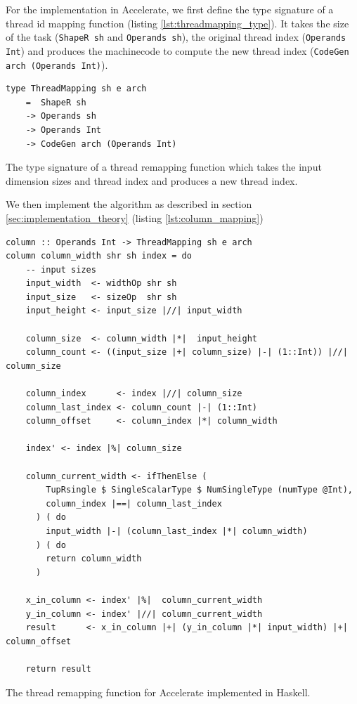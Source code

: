 For the implementation in Accelerate, we first define the type signature of a thread id mapping function (listing {\ref{lst:threadmapping_type}}).
It takes the size of the task (\texttt{ShapeR sh} and \texttt{Operands sh}), the  original thread index (\texttt{Operands Int}) and produces the machinecode to compute the new thread index (\texttt{CodeGen arch (Operands Int)}).
\begin{listing}[!ht]
    \begin{verbatim}    
type ThreadMapping sh e arch 
    =  ShapeR sh 
    -> Operands sh 
    -> Operands Int 
    -> CodeGen arch (Operands Int)
    \end{verbatim}
    \caption{
        The type signature of a thread remapping function which takes the input dimension sizes and thread index and produces a new thread index.
    }
    \label{lst:threadmapping_type}
\end{listing}
We then implement the algorithm as described in section \ref{sec:implementation_theory} (listing \ref{lst:column_mapping})
\begin{listing}[ht]
    \begin{verbatim}
column :: Operands Int -> ThreadMapping sh e arch
column column_width shr sh index = do
    -- input sizes
    input_width  <- widthOp shr sh
    input_size   <- sizeOp  shr sh
    input_height <- input_size |//| input_width
    
    column_size  <- column_width |*|  input_height
    column_count <- ((input_size |+| column_size) |-| (1::Int)) |//| column_size

    column_index      <- index |//| column_size
    column_last_index <- column_count |-| (1::Int)
    column_offset     <- column_index |*| column_width

    index' <- index |%| column_size

    column_current_width <- ifThenElse (
        TupRsingle $ SingleScalarType $ NumSingleType (numType @Int), 
        column_index |==| column_last_index
      ) ( do
        input_width |-| (column_last_index |*| column_width)
      ) ( do
        return column_width
      )
    
    x_in_column <- index' |%|  column_current_width
    y_in_column <- index' |//| column_current_width
    result      <- x_in_column |+| (y_in_column |*| input_width) |+| column_offset

    return result
    \end{verbatim}
    \caption{
        The thread remapping function for Accelerate implemented in Haskell.
    }
    \label{lst:column_mapping}
\end{listing}

